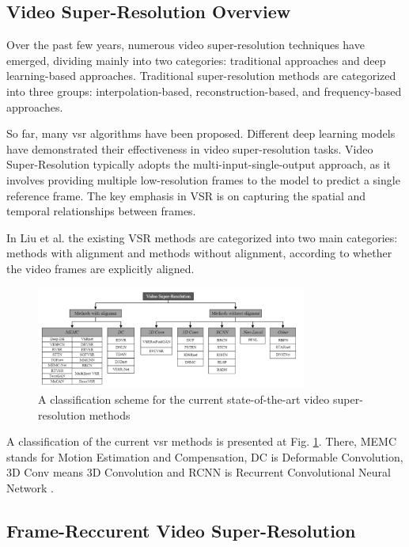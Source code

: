 \documentclass[conference]{IEEEtran}
\begin{document}
\subsection{Video Super-Resolution Overview}

Over the past few years, numerous video super-resolution techniques have emerged, dividing mainly into two categories: traditional approaches and deep learning-based approaches. Traditional super-resolution methods are categorized into three groups: interpolation-based, reconstruction-based, and frequency-based approaches.

So far, many \acrshort{vsr} algorithms have been proposed. Different deep learning models have demonstrated their effectiveness in video super-resolution tasks. Video Super-Resolution typically adopts the multi-input-single-output approach, as it involves providing multiple low-resolution frames to the model to predict a single reference frame. The key emphasis in VSR is on capturing the spatial and temporal relationships between frames.

In Liu et al. \cite{video_super_resolution_survey_2020} the existing VSR methods are categorized into two main categories: methods with alignment and methods without alignment, according to whether the video frames are explicitly aligned.

\begin{figure}[t]
    \centering
    \centerline{\includegraphics[width=8.9cm]{vsr_methods}}
    \caption{A classification scheme for the current state-of-the-art video super-resolution methods \cite{video_super_resolution_survey_2020}}
    \label{fig:vsr_methods}
\end{figure}

A classification of the current \acrshort{vsr} methods is presented at Fig. \ref{fig:vsr_methods}. There, MEMC stands for Motion Estimation and Compensation, DC is Deformable Convolution, 3D Conv means 3D Convolution and RCNN is Recurrent Convolutional Neural Network \cite{video_super_resolution_survey_2020}.

\subsection{Frame-Reccurent Video Super-Resolution}
\end{document}
